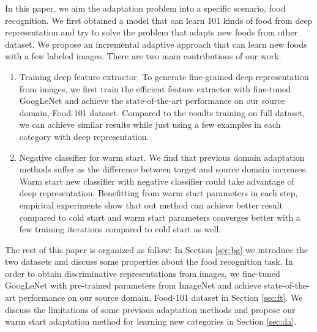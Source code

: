 In this paper, we aim the adaptation problem into a specific scenario, food recognition. We first obtained a model that can learn 101 kinds of food from deep representation and try to solve the problem that adapts new foods from other dataset. We propose an incremental adaptive approach that can learn new foods with a few labeled images. There are two main contributions of our work:
\begin{enumerate}
  \item Training deep feature extractor. To generate fine-grained deep representation from images, we first train the efficient feature extractor with fine-tuned GoogLeNet and achieve the state-of-the-art performance on our source domain, Food-101 dataset. Compared to the results training on full dataset, we can achieve similar results while just using a few examples in each category with deep representation.
  \item Negative classifier for warm start. We find that previous domain adaptation methods suffer as the difference between target and source domain increases. Warm start new classifier with negative classifier could take advantage of deep representation. Benefitting from warm start parameters in each step, empirical experiments show that out method can achieve better result compared to cold start and warm start parameters converges better with a few training iterations compared to cold start as well.
\end{enumerate}

The rest of this paper is organized as follow: In Section \ref{sec:bg} we introduce the two datasets and discuss some properties about the food recognition task. In order to obtain discriminative representations from images, we fine-tuned GoogLeNet with pre-trained parameters from ImageNet and achieve state-of-the-art performance on our source domain, Food-101 dataset in Section \ref{sec:ft}. We discuss the limitations of some previous adaptation methods and propose our warm start adaptation method for learning new categories in Section \ref{sec:da}.
